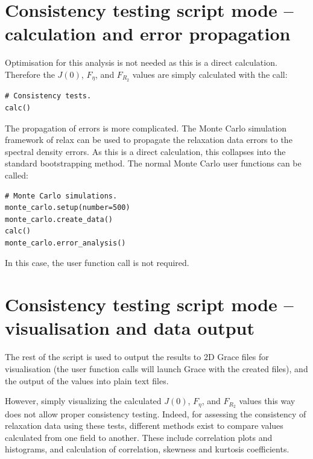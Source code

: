 
\section{Consistency testing script mode -- calculation and error propagation}

Optimisation for this analysis is not needed as this is a direct calculation.
Therefore the $J(0)$, $F_\eta$, and $F_{R_2}$ values are simply calculated with the call:

\begin{lstlisting}[firstnumber=65]
# Consistency tests.
calc()
\end{lstlisting}

The propagation of errors is more complicated.
The Monte Carlo simulation framework of relax can be used to propagate the relaxation data errors to the spectral density errors.
As this is a direct calculation, this collapses into the standard bootstrapping method.
The normal Monte Carlo user functions can be called:

\begin{lstlisting}[firstnumber=68]
# Monte Carlo simulations.
monte_carlo.setup(number=500)
monte_carlo.create_data()
calc()
monte_carlo.error_analysis()
\end{lstlisting}

In this case, the  user function call is not required.



\section{Consistency testing script mode -- visualisation and data output}
\label{sec: Visualisation and data output}

The rest of the script is used to output the results to 2D Grace files for visualisation (the  user function calls will launch Grace with the created files), and the output of the values into plain text files.

However, simply visualizing the calculated $J(0)$, $F_\eta$, and $F_{R_2}$ values this way does not allow proper consistency testing.
Indeed, for assessing the consistency of relaxation data using these tests, different methods exist to compare values calculated from one field to another.
These include correlation plots and histograms, and calculation of correlation, skewness and kurtosis coefficients.

